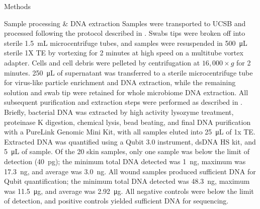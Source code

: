 \documentclass[oneside,12pt,final]{sty/ucthesis-CA2012}
\begin{document}
\begin{mainmatter}
\begin{section}{Methods}
\begin{subsection}{Sample processing \& DNA extraction}
Samples were transported to UCSB and processed following the protocol described in \cite{RN41}. Swabs tips were broken off into sterile \SI{1.5}{\milli\liter} microcentrifuge tubes, and samples were resuspended in \SI{500}{\micro\liter} sterile 1X TE by vortexing for 2 minutes at high speed on a multitube vortex adapter. Cells and cell debris were pelleted by centrifugation at $16,000 \times g$ for 2 minutes. \SI{250}{\micro\liter} of supernatant was transferred to a sterile microcentrifuge tube for virus-like particle enrichment and DNA extraction, while the remaining solution and swab tip were retained for whole microbiome DNA extraction. All subsequent purification and extraction steps were performed as described in \cite{RN41}. Briefly, bacterial DNA was extracted by high activity lysozyme treatment, proteinase K digestion, chemical lysis, bead beating, and final DNA purification with a PureLink Genomic Mini Kit, with all samples eluted into \SI{25}{\micro\liter} of 1x TE. Extracted DNA was quantified using a Qubit 3.0 instrument, dsDNA HS kit, and \SI{5}{\micro\liter} of sample. Of the 20 skin samples, only one sample was below the limit of detection (\SI{40}{\pico\gram}); the minimum total DNA detected was \SI{1}{\nano\gram}, maximum was \SI{17.3}{\nano\gram}, and average was \SI{3.0}{\nano\gram}. All wound samples produced sufficient DNA for Qubit quantification; the minimum total DNA detected was \SI{48.3}{\nano\gram}, maximum was \SI{11.5}{\micro\gram}, and average was \SI{2.92}{\micro\gram}. All negative controls were below the limit of detection, and positive controls yielded sufficient DNA for sequencing.
\end{subsection}


\end{section}
\end{mainmatter}
\end{document}
